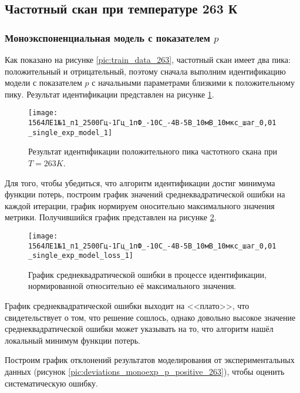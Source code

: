 	\newpage
	\subsection{Частотный скан при температуре 263 К}
	\subsubsection{Моноэкспоненциальная модель с показателем $p$}

	Как показано на рисунке \ref{pic:train_data_263}, частотный скан имеет два
	пика: положительный и отрицательный, поэтому сначала выполним идентификацию
	модели с показателем $p$ с начальными параметрами близкими к положительному
	пику. Результат идентификации представлен на рисунке 
	\ref{pic:model_monoexp_p_positive_263}.

	\begin{figure}[!htp]
		\centering
		\texttt{[image: 1564ЛЕ1№1\_п1\_2500Гц-1Гц\_1пФ\_-10С\_-4В-5В\_10мВ\_10мкс\_шаг\_0,01\_single\_exp\_model\_1]}
		\caption{Результат идентификации положительного пика частотного скана
		         при $T=263K$.}
		\label{pic:model_monoexp_p_positive_263}
	\end{figure}

	Для того, чтобы убедиться, что алгоритм идентификации достиг минимума 
	функции потерь, построим график значений среднеквадратической ошибки на 
	каждой итерации, график нормируем оносительно максимального значения метрики.
	Получившийся график представлен на рисунке \ref{pic:loss_monoexp_p_positive_263}.

	\begin{figure}[!htp]
		\centering
		\texttt{[image: 1564ЛЕ1№1\_п1\_2500Гц-1Гц\_1пФ\_-10С\_-4В-5В\_10мВ\_10мкс\_шаг\_0,01\_single\_exp\_model\_loss\_1]}
		\caption{График среднеквадратической ошибки в процессе идентификации,
		         нормированной относительно её максимального значения.}
		\label{pic:loss_monoexp_p_positive_263}
	\end{figure}

	График среднеквадратической ошибки выходит на <<плато>>, что свидетельствует 
	о том, что решение сошлось, однако довольно высокое значение 
	среднеквадратической ошибки может указывать на то, что алгоритм нашёл 
	локальный минимум функции потерь.

	Построим график отклонений результатов моделирования от экспериментальных 
	данных (рисунок \ref{pic:deviations_monoexp_p_positive_263}), чтобы оценить 
	систематическую ошибку.

